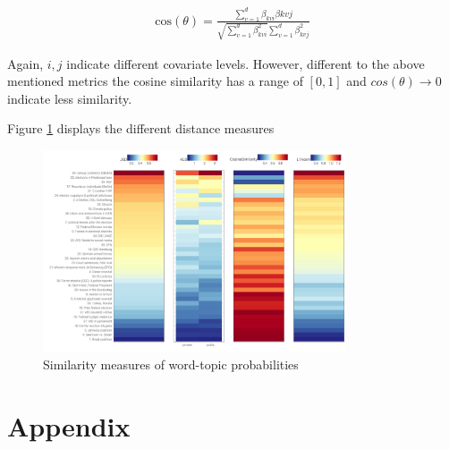 \documentclass[12pt,a4paper,notitlepage]{article}
\begin{document}
\begin{align*}
	\text{cos}(\theta)=\frac{\sum^d_{v=1}\beta_{kvi}\beta{kvj}}{\sqrt{\sum^d_{v=1}\beta_{kvi}^2}\sum^d_{v=1}\beta_{kvj}^2}
\end{align*}

Again, $i, j$ indicate different covariate levels. However, different to the above mentioned metrics the cosine similarity has a range of $[0,1]$ and $cos(\theta) \to 0$ indicate less similarity.

Figure \ref{fig_distance} displays the different distance measures 

\begin{figure}[H]
	\begin{center}
		\includegraphics[width=0.8\textwidth,keepaspectratio]{../figs/distance}
		\caption{Similarity measures of word-topic probabilities}
		\label{fig_distance}
	\end{center}
\end{figure}


\section*{Appendix}
\end{document}
